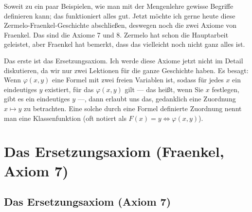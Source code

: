 \begin{spoken-clean}[01:19:48 - 01:21:39]
Soweit zu ein paar Beispielen, wie man mit der Mengenlehre gewisse Begriffe definieren kann; das funktioniert alles gut. Jetzt möchte ich gerne heute diese Zermelo-Fraenkel-Geschichte abschließen, deswegen noch die zwei Axiome von Fraenkel. Das sind die Axiome 7 und 8. Zermelo hat schon die Hauptarbeit geleistet, aber Fraenkel hat bemerkt, dass das vielleicht noch nicht ganz alles ist.

Das erste ist das Ersetzungsaxiom. Ich werde diese Axiome jetzt nicht im Detail diskutieren, da wir nur zwei Lektionen für die ganze Geschichte haben. Es besagt: Wenn $\varphi(x, y)$ eine Formel mit zwei freien Variablen ist, sodass für jedes $x$ ein eindeutiges $y$ existiert, für das $\varphi(x, y)$ gilt --- das heißt, wenn Sie $x$ festlegen, gibt es ein eindeutiges $y$ ---, dann erlaubt uns das, gedanklich eine Zuordnung $x \mapsto y$ zu betrachten. Eine solche durch eine Formel definierte Zuordnung nennt man eine Klassenfunktion (oft notiert als $F(x) = y \iff \varphi(x, y)$).
\end{spoken-clean}

\section{Das Ersetzungsaxiom (Fraenkel, Axiom 7)}

\subsection{Das Ersetzungsaxiom (Axiom 7)}


